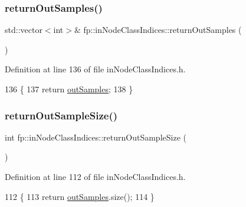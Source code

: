 \subsubsection{\texorpdfstring{return\+Out\+Samples()}{returnOutSamples()}}
{\footnotesize\ttfamily std\+::vector$<$int$>$\& fp\+::in\+Node\+Class\+Indices\+::return\+Out\+Samples (\begin{DoxyParamCaption}{ }\end{DoxyParamCaption})\hspace{0.3cm}{\ttfamily [inline]}}



Definition at line 136 of file in\+Node\+Class\+Indices.\+h.


\begin{DoxyCode}
136                                                      \{
137                 \textcolor{keywordflow}{return} \hyperlink{classfp_1_1inNodeClassIndices_afaa76dfa346ba9de197b1cbd7a1557f9}{outSamples};
138             \}
\end{DoxyCode}
\mbox{\label{classfp_1_1inNodeClassIndices_ab7c873166d2be3b13d0f81d0fed2c57f}} 
\subsubsection{\texorpdfstring{return\+Out\+Sample\+Size()}{returnOutSampleSize()}}
{\footnotesize\ttfamily int fp\+::in\+Node\+Class\+Indices\+::return\+Out\+Sample\+Size (\begin{DoxyParamCaption}{ }\end{DoxyParamCaption})\hspace{0.3cm}{\ttfamily [inline]}}



Definition at line 112 of file in\+Node\+Class\+Indices.\+h.


\begin{DoxyCode}
112                                             \{
113                 \textcolor{keywordflow}{return} \hyperlink{classfp_1_1inNodeClassIndices_afaa76dfa346ba9de197b1cbd7a1557f9}{outSamples}.size();
114             \}
\end{DoxyCode}
\mbox{\label{classfp_1_1inNodeClassIndices_a19c5ff722a6fc3e1c7b8bddd6ecdb640}} 
